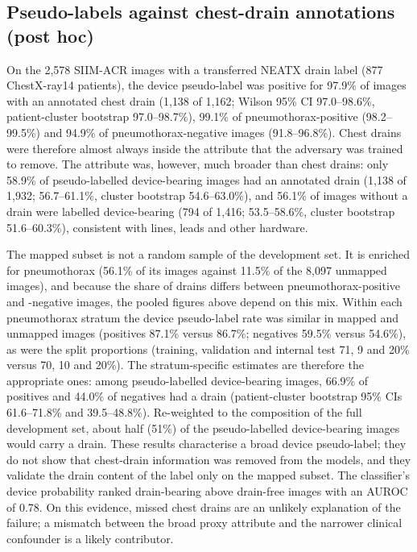 \documentclass{ieeeaccess}
\begin{document}
\subsection{Pseudo-labels against chest-drain annotations (post hoc)}
\label{sec:res-pseudo}
On the 2{,}578 SIIM-ACR images with a transferred NEATX drain label (877 ChestX-ray14 patients), the device pseudo-label was positive for 97.9\% of images with an annotated chest drain (1{,}138 of 1{,}162; Wilson 95\% CI 97.0--98.6\%, patient-cluster bootstrap 97.0--98.7\%), 99.1\% of pneumothorax-positive (98.2--99.5\%) and 94.9\% of pneumothorax-negative images (91.8--96.8\%). Chest drains were therefore almost always inside the attribute that the adversary was trained to remove. The attribute was, however, much broader than chest drains: only 58.9\% of pseudo-labelled device-bearing images had an annotated drain (1{,}138 of 1{,}932; 56.7--61.1\%, cluster bootstrap 54.6--63.0\%), and 56.1\% of images without a drain were labelled device-bearing (794 of 1{,}416; 53.5--58.6\%, cluster bootstrap 51.6--60.3\%), consistent with lines, leads and other hardware.

The mapped subset is not a random sample of the development set. It is enriched for pneumothorax (56.1\% of its images against 11.5\% of the 8{,}097 unmapped images), and because the share of drains differs between pneumothorax-positive and -negative images, the pooled figures above depend on this mix. Within each pneumothorax stratum the device pseudo-label rate was similar in mapped and unmapped images (positives 87.1\% versus 86.7\%; negatives 59.5\% versus 54.6\%), as were the split proportions (training, validation and internal test 71, 9 and 20\% versus 70, 10 and 20\%). The stratum-specific estimates are therefore the appropriate ones: among pseudo-labelled device-bearing images, 66.9\% of positives and 44.0\% of negatives had a drain (patient-cluster bootstrap 95\% CIs 61.6--71.8\% and 39.5--48.8\%). Re-weighted to the composition of the full development set, about half (51\%) of the pseudo-labelled device-bearing images would carry a drain. These results characterise a broad device pseudo-label; they do not show that chest-drain information was removed from the models, and they validate the drain content of the label only on the mapped subset. The classifier's device probability ranked drain-bearing above drain-free images with an AUROC of 0.78. On this evidence, missed chest drains are an unlikely explanation of the failure; a mismatch between the broad proxy attribute and the narrower clinical confounder is a likely contributor.
\end{document}
